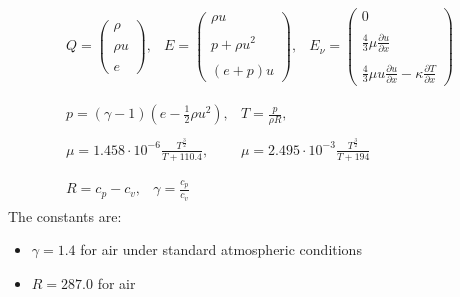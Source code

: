 \documentclass[11pt, a4paper]{article}
\begin{document}
\begin{equation}
    \begin{array}{c}
        \begin{matrix}
            Q=\begin{pmatrix}
                \rho \\\\
                \rho u \\\\
                e
            \end{pmatrix}, & E=\begin{pmatrix}
                \rho u \\\\
                p+\rho u^2 \\\\
                \left(e+p\right)u
            \end{pmatrix}, & E_\nu=\begin{pmatrix}
                0 \\\\
                \displaystyle\frac{4}{3}\mu\frac{\partial u}{\partial x} \\\\
                \displaystyle\frac{4}{3}\mu u\frac{\partial u}{\partial x}-\kappa\frac{\partial T}{\partial x}
            \end{pmatrix}
        \end{matrix} \\\\
        \begin{matrix}
            \displaystyle p=\left(\gamma-1\right)\left(e-\frac{1}{2}\rho u^2\right), & \displaystyle T=\frac{p}{\rho R}, \\\\
            \displaystyle\mu=1.458\cdot10^{-6}\frac{T^{\frac{3}{2}}}{T+110.4}, & \displaystyle\mu=2.495\cdot10^{-3}\frac{T^{\frac{3}{2}}}{T+194}
        \end{matrix} \\\\
        \begin{matrix}
            R=c_p-c_v, & \displaystyle\gamma=\frac{c_p}{c_v}
        \end{matrix}
    \end{array}
    \label{eq: definitions}
\end{equation}
The constants are:
\begin{itemize}
    \item $\gamma=1.4$ for air under standard atmospheric conditions
    \item $R=287.0$ for air
\end{itemize}
\end{document}
